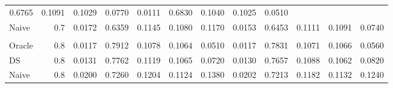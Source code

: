\begin{tabular}{llllllllllll}
  \multicolumn{1}{r}{0.6765} &
  \multicolumn{1}{r}{0.1091} &
  \multicolumn{1}{r}{0.1029} &
  \multicolumn{1}{r}{0.0770} &
  \multicolumn{1}{r}{0.0111} &
  \multicolumn{1}{r}{0.6830} &
  \multicolumn{1}{r}{0.1040} &
  \multicolumn{1}{r}{0.1025} &
  \multicolumn{1}{r}{0.0510} \\
\multicolumn{1}{l}{\hspace{1em}Naive} &
  \multicolumn{1}{|r}{0.7} &
  \multicolumn{1}{r}{0.0172} &
  \multicolumn{1}{r}{0.6359} &
  \multicolumn{1}{r}{0.1145} &
  \multicolumn{1}{r}{0.1080} &
  \multicolumn{1}{r}{0.1170} &
  \multicolumn{1}{r}{0.0153} &
  \multicolumn{1}{r}{0.6453} &
  \multicolumn{1}{r}{0.1111} &
  \multicolumn{1}{r}{0.1091} &
  \multicolumn{1}{r}{0.0740} \\
\multicolumn{1}{l}{} &
  \multicolumn{1}{|r}{} &
  \multicolumn{1}{r}{} &
  \multicolumn{1}{r}{} &
  \multicolumn{1}{r}{} &
  \multicolumn{1}{r}{} &
  \multicolumn{1}{r}{} &
  \multicolumn{1}{r}{} &
  \multicolumn{1}{r}{} &
  \multicolumn{1}{r}{} &
  \multicolumn{1}{r}{} &
  \multicolumn{1}{r}{} \\
\multicolumn{1}{l}{\hspace{1em}Oracle} &
  \multicolumn{1}{|r}{0.8} &
  \multicolumn{1}{r}{0.0117} &
  \multicolumn{1}{r}{0.7912} &
  \multicolumn{1}{r}{0.1078} &
  \multicolumn{1}{r}{0.1064} &
  \multicolumn{1}{r}{0.0510} &
  \multicolumn{1}{r}{0.0117} &
  \multicolumn{1}{r}{0.7831} &
  \multicolumn{1}{r}{0.1071} &
  \multicolumn{1}{r}{0.1066} &
  \multicolumn{1}{r}{0.0560} \\
\multicolumn{1}{l}{\hspace{1em}DS} &
  \multicolumn{1}{|r}{0.8} &
  \multicolumn{1}{r}{0.0131} &
  \multicolumn{1}{r}{0.7762} &
  \multicolumn{1}{r}{0.1119} &
  \multicolumn{1}{r}{0.1065} &
  \multicolumn{1}{r}{0.0720} &
  \multicolumn{1}{r}{0.0130} &
  \multicolumn{1}{r}{0.7657} &
  \multicolumn{1}{r}{0.1088} &
  \multicolumn{1}{r}{0.1062} &
  \multicolumn{1}{r}{0.0820} \\
\multicolumn{1}{l}{\hspace{1em}Naive} &
  \multicolumn{1}{|r}{0.8} &
  \multicolumn{1}{r}{0.0200} &
  \multicolumn{1}{r}{0.7260} &
  \multicolumn{1}{r}{0.1204} &
  \multicolumn{1}{r}{0.1124} &
  \multicolumn{1}{r}{0.1380} &
  \multicolumn{1}{r}{0.0202} &
  \multicolumn{1}{r}{0.7213} &
  \multicolumn{1}{r}{0.1182} &
  \multicolumn{1}{r}{0.1132} &
  \multicolumn{1}{r}{0.1240} \\
\cline{1-12}
\end{tabular}
